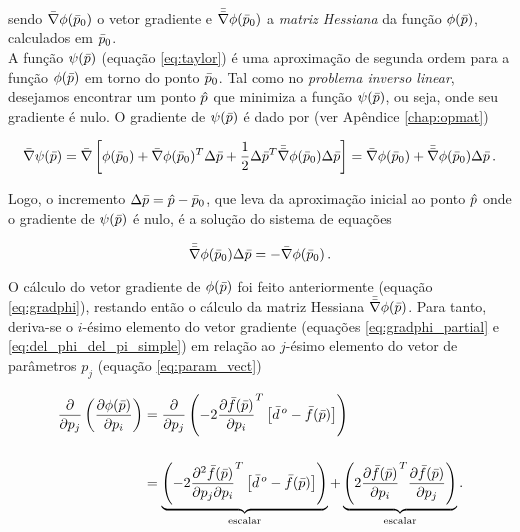 \noindent sendo $\bar{\nabla}\phi(\bar{p}_0)$ o vetor gradiente  e
$\bar{\bar{\nabla}}\phi(\bar{p}_0)$ a {\it matriz Hessiana} da função $\phi(\bar{p})$,
calculados em $\bar{p}_0$.
\\
\indent A função $\psi(\bar{p})$ (equação \ref{eq:taylor}) é uma aproximação
de segunda ordem para a função $\phi(\bar{p})$ em torno do ponto $\bar{p}_0$.
Tal como no {\it problema inverso linear}, desejamos encontrar um ponto $\hat{p}$
que minimiza a função $\psi(\bar{p})$, ou seja, onde seu gradiente é nulo.
O gradiente de $\psi(\bar{p})$ é dado por (ver Apêndice \ref{chap:opmat})

\begin{equation}
\bar{\nabla}\psi(\bar{p}) = \bar{\nabla}\left[
    \phi(\bar{p}_0) +
    \bar{\nabla}\phi(\bar{p}_0)^T\Delta\bar{p} +
    \dfrac{1}{2}\Delta\bar{p}^T\bar{\bar{\nabla}}\phi(\bar{p}_0)\Delta\bar{p}
    \right] =
    \bar{\nabla}\phi(\bar{p}_0) + \bar{\bar{\nabla}}\phi(\bar{p}_0)\Delta\bar{p}
    \thinspace .
\end{equation}

\noindent Logo, o incremento $\Delta\bar{p} = \hat{p} - \bar{p}_0$, que leva
da aproximação inicial ao ponto $\hat{p}$ onde o gradiente de $\psi(\bar{p})$ é
nulo, é a solução do sistema de equações

\begin{equation}
     \bar{\bar{\nabla}}\phi(\bar{p}_0)\Delta\bar{p} = -\bar{\nabla}\phi(\bar{p}_0)
    \thinspace .
\label{eq:sistema_normal_nlin}
\end{equation}

\indent O cálculo do vetor gradiente de $\phi(\bar{p})$ foi feito anteriormente
(equação \ref{eq:gradphi}), restando então o cálculo da matriz Hessiana
$\bar{\bar{\nabla}}\phi(\bar{p})$.
Para tanto, deriva-se o $i$-ésimo elemento do vetor gradiente
(equações \ref{eq:gradphi_partial} e \ref{eq:del_phi_del_pi_simple}) em relação
ao $j$-ésimo elemento do vetor de parâmetros $p_j$ (equação \ref{eq:param_vect})

\begin{equation}
\begin{split}
\dfrac{\partial}{\partial p_j}\left(\dfrac{\partial \phi(\bar{p})}{\partial p_i}\right)
&=
\dfrac{\partial}{\partial p_j}\left(
    -2\dfrac{\partial\bar{f}(\bar{p})}{\partial p_i}^T
    \left[\bar{d}^{\thinspace o} - \bar{f}(\bar{p})\right]
    \right)
\\[0.5cm]
&=
\underbrace{
\left( -2\dfrac{\partial^2 \bar{f}(\bar{p})}{\partial p_j \partial p_i}^T
\left[\bar{d}^{\thinspace o} - \bar{f}(\bar{p})\right]
\right)}_{\text{escalar}} +
\underbrace{
\left( 2 \dfrac{\partial\bar{f}(\bar{p})}{\partial p_i}^T
    \dfrac{\partial\bar{f}(\bar{p})}{\partial p_j} \right)}_{\text{escalar}} .
\end{split}
\label{eq:hessian_ij_exact}
\end{equation}


